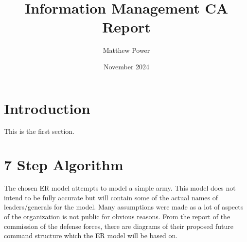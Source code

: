 \documentclass{article}
\title{Information Management CA Report}
\author{Matthew Power}
\date{November 2024}
\begin{document}
  
\maketitle
  
\tableofcontents

\section{Introduction}
   
This is the first section.
      
\section{7 Step Algorithm}
       

The chosen ER model attempts to model a simple army. This model does not intend to be fully
accurate but will contain some of the actual names of leaders/generals for the model. 
Many assumptions were made as a lot of aspects of the organization is not public for obvious reasons. 
From the report of the commission of the defense forces, there are diagrams of their proposed 
future command structure which the ER model will be based on.
\end{document}
